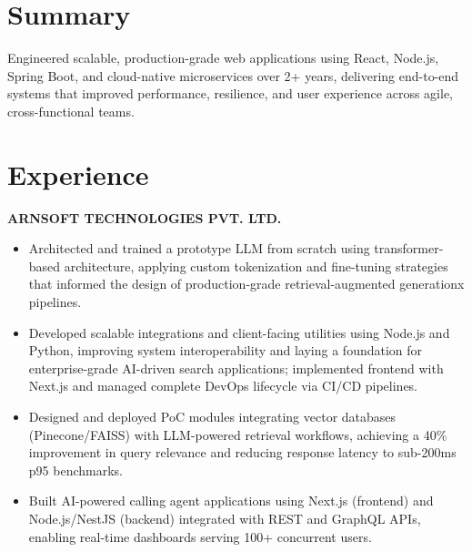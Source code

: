 \documentclass[letterpaper,10pt]{article}
\newcommand{\runsubsection}[1]{
  \color{subheadings}\fontsize{11pt}{13pt}\selectfont\bfseries\uppercase{#1}\normalfont
}
\newcommand{\descript}[1]{
  \color{subheadings}\raggedright\scshape\fontsize{10pt}{12pt}\selectfont{#1\\}\normalfont
}
\newcommand{\location}[1]{
  \color{headings}\raggedright\fontsize{9pt}{11pt}\selectfont{#1\\}\normalfont
}
\newenvironment{tightitemize}{
  \vspace{2pt}\begin{itemize}[leftmargin=12pt]\itemsep1pt \parskip0pt \parsep0pt
}{
  \end{itemize}\vspace{-\topsep}
}
\newcommand{\sectionsep}{\vspace{6pt}}
\begin{document}
\begin{minipage}[t]{0.66\textwidth}


\section{Summary}
\small{Engineered scalable, production-grade web applications using React, Node.js, Spring Boot, and cloud-native microservices over 2+ years, delivering end-to-end systems that improved performance, resilience, and user experience across agile, cross-functional teams.}
\sectionsep



\section{Experience}


\runsubsection{Arnsoft Technologies Pvt. Ltd.}
\descript{| Software Developer}
\location{2025-05 -- Present | Hyderabad, Telangana}
\begin{tightitemize}

\item Architected and trained a prototype LLM from scratch using transformer-based architecture, applying custom tokenization and fine-tuning strategies that informed the design of production-grade retrieval-augmented generationx pipelines.

\item Developed scalable integrations and client-facing utilities using Node.js and Python, improving system interoperability and laying a foundation for enterprise-grade AI-driven search applications; implemented frontend with Next.js and managed complete DevOps lifecycle via CI/CD pipelines.

\item Designed and deployed PoC modules integrating vector databases (Pinecone/FAISS) with LLM-powered retrieval workflows, achieving a 40\% improvement in query relevance and reducing response latency to sub-200ms p95 benchmarks.

\item Built AI-powered calling agent applications using Next.js (frontend) and Node.js/NestJS (backend) integrated with REST and GraphQL APIs, enabling real-time dashboards serving 100+ concurrent users.

\end{tightitemize}
\sectionsep


\end{minipage}
\end{document}
